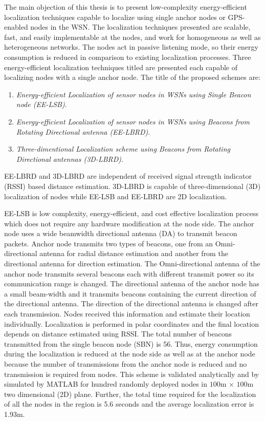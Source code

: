 %
\par The main objection of this thesis is to present low-complexity energy-efficient localization techniques capable to localize using single anchor nodes or GPS-enabled nodes in the WSN. The localization techniques presented are scalable, fast, and easily implementable at the nodes, and work for homogeneous as well as heterogeneous networks. The nodes act in passive listening mode, so their energy consumption is reduced in comparison to existing localization processes. Three energy-efficient localization techniques titled are presented each capable of localizing nodes with a single anchor node.
The title of the proposed schemes are:
\begin{enumerate}
\item \emph{Energy-efficient Localization of sensor nodes in WSNs using Single Beacon node (EE-LSB)}. \item \emph{Energy-efficient Localization of sensor nodes in WSNs using Beacons from Rotating Directional antenna (EE-LBRD)}.
\item \emph{Three-dimentional Localization scheme using Beacons from Rotating Directional antennas (3D-LBRD)}.
\end{enumerate}
EE-LBRD and 3D-LBRD are independent of received signal strength indicator (RSSI) based distance estimation. 3D-LBRD is capable of three-dimensional (3D) localization of nodes while EE-LSB and EE-LBRD are 2D localization.
\par EE-LSB is low complexity, energy-efficient, and cost effective localization process which does not require any hardware modification at the node side. The anchor node uses a wide beamwidth directional antenna (DA) to transmit beacon packets. Anchor node transmits two types of beacons, one from an Omni-directional antenna for radial distance estimation and another from the directional antenna for direction estimation. The Omni-directional antenna of the anchor node transmits several beacons each with different transmit power so its communication range is changed. The directional antenna of the anchor node has a small beam-width and it transmits beacons containing the current direction of the directional antenna. The direction of the directional antenna is changed after each transmission. Nodes received this information and estimate their location individually. Localization is performed in polar coordinates and the final location depends on distance estimated using RSSI. The total number of beacons transmitted from the single beacon node (SBN) is 56. Thus, energy consumption during the localization is reduced at the node side as well as at the anchor node because the number of transmissions from the anchor node is reduced and no transmission is required from nodes. This scheme is validated analytically and by simulated by MATLAB for hundred randomly deployed nodes in $100$m $\times$ $100$m two dimensional (2D) plane. Further, the total time required for the localization of all the nodes in the region is 5.6 seconds and the average localization error is 1.93m.%
